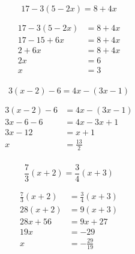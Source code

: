 \documentclass[letterpaper, landscape]{exam}
\begin{document}
  \begin{questions}
    

    \question[5]
      \[ 
        17 - 3(5 - 2x) = 8 + 4x
      \]

      \begin{solution}
        \begin{align*}
          17 - 3(5 - 2x) & = 8 + 4x \\
          17 - 15 + 6x   & = 8 + 4x \\
          2 + 6x         & = 8 + 4x \\
          2x             & = 6 \\
          x              & = \boxed{ 3 } \\
        \end{align*}
      \end{solution}

    \question[5]
      \[
        3(x - 2) - 6 = 4x - (3x - 1)
      \]

      \begin{solution}
        \begin{align*}
        3(x - 2) - 6 & = 4x - (3x - 1) \\
        3x - 6 - 6   & = 4x - 3x + 1 \\
        3x - 12      & = x + 1 \\
        x            & = \boxed{ \frac{13}{2} } \\
        \end{align*}
      \end{solution}

    \question[10]
      \[ 
        \frac{7}{3} (x + 2) = \frac{3}{4} (x + 3)
      \]

      \begin{solution}
        \begin{align*}
          \frac{7}{3} (x + 2) & = \frac{3}{4} (x + 3) \\
          28 (x + 2)          & = 9 (x + 3) \\
          28x + 56            & = 9x + 27 \\
          19x                 & = -29 \\
          x                   & = \boxed{ - \frac{29}{19} } \\
        \end{align*}
      \end{solution}


\end{questions}
\end{document}
